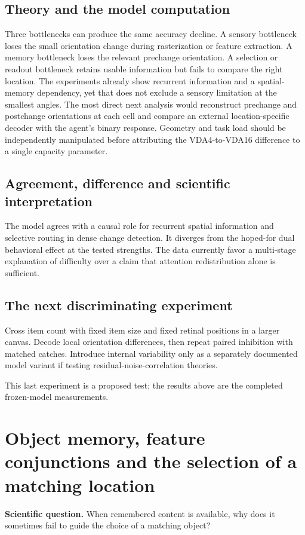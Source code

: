 \documentclass[11pt]{article}
\begin{document}
\subsection{Theory and the model computation}
Three bottlenecks can produce the same accuracy decline. A sensory bottleneck loses the small orientation change during rasterization or feature extraction. A memory bottleneck loses the relevant prechange orientation. A selection or readout bottleneck retains usable information but fails to compare the right location. The experiments already show recurrent information and a spatial-memory dependency, yet that does not exclude a sensory limitation at the smallest angles. The most direct next analysis would reconstruct prechange and postchange orientations at each cell and compare an external location-specific decoder with the agent’s binary response. Geometry and task load should be independently manipulated before attributing the VDA4-to-VDA16 difference to a single capacity parameter.

\subsection{Agreement, difference and scientific interpretation}
The model agrees with a causal role for recurrent spatial information and selective routing in dense change detection. It diverges from the hoped-for dual behavioral effect at the tested strengths. The data currently favor a multi-stage explanation of difficulty over a claim that attention redistribution alone is sufficient.

\subsection{The next discriminating experiment}
Cross item count with fixed item size and fixed retinal positions in a larger canvas. Decode local orientation differences, then repeat paired inhibition with matched catches. Introduce internal variability only as a separately documented model variant if testing residual-noise-correlation theories.

This last experiment is a proposed test; the results above are the completed frozen-model measurements.
\clearpage\section{Object memory, feature conjunctions and the selection of a matching location}
\textbf{Scientific question.} When remembered content is available, why does it sometimes fail to guide the choice of a matching object?
\end{document}

